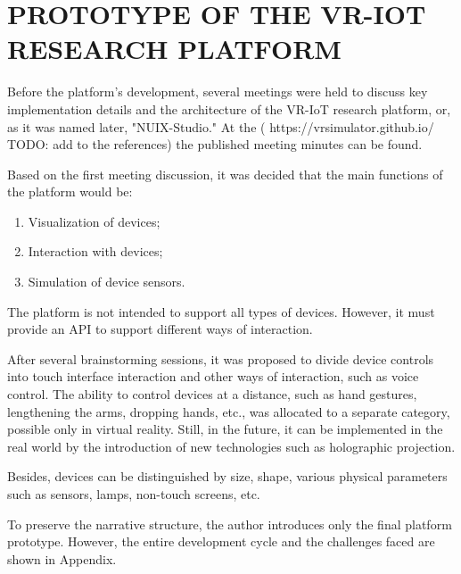 
\chapter{PROTOTYPE OF THE VR-IOT RESEARCH PLATFORM}

Before the platform's development, several meetings were held to discuss key implementation details and the architecture of the VR-IoT research platform, or, as it was named later, "NUIX-Studio." At the ( https://vrsimulator.github.io/ TODO: add to the references) the published meeting minutes can be found. 

Based on the first meeting discussion, it was decided that the main functions of the platform would be:
\begin{enumerate}
     \item Visualization of devices;
     \item Interaction with devices;
     \item Simulation of device sensors.
\end{enumerate}

The platform is not intended to support all types of devices. However, it must provide an API to support different ways of interaction.

After several brainstorming sessions, it was proposed to divide device controls into touch interface interaction and other ways of interaction, such as voice control. The ability to control devices at a distance, such as hand gestures, lengthening the arms, dropping hands, etc., was allocated to a separate category, possible only in virtual reality. Still, in the future, it can be implemented in the real world by the introduction of new technologies such as holographic projection.

Besides, devices can be distinguished by size, shape, various physical parameters such as sensors, lamps, non-touch screens, etc.

To preserve the narrative structure, the author introduces only the final platform prototype. However, the entire development cycle and the challenges faced are shown in Appendix.

